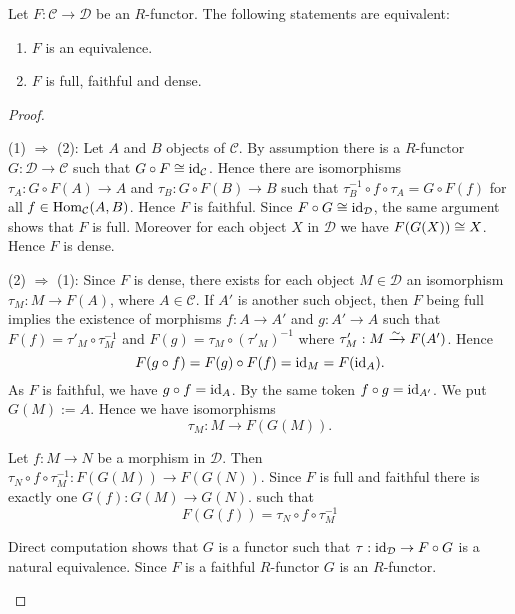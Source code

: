\begin{theorem}\label{3.1.1}
  Let $F: \mathcal{C} \to \mathcal{D}$ be an $R$-functor. The following statements are equivalent:
  \begin{enumerate}
  \item $F$ is an equivalence.
  \item $F$ is full, faithful and dense.
  \end{enumerate}
\end{theorem}
\begin{proof}\
\begin{addmargin}[1cm]{0cm}
\hspace{-1cm}(1) $\Rightarrow$ (2): Let $A$ and $B$ objects of $\mathcal{C}$. By assumption there is a
  $R$-functor $G: \mathcal{D} \to \mathcal{C}$ such that $G \circ F \cong \operatorname{id}_\mathcal{C}$. Hence there are isomorphisms
  $\tau_A: G \circ F(A) \to A$ and $\tau_B: G \circ F(B) \to B$ such that $\tau_B^{-1} \circ f \circ \tau_A = G
  \circ F(f)$ for all $f \in \operatorname{Hom}_\mathcal{C}(A,B)$. Hence $F$ is faithful. Since $F \circ G \cong
  \operatorname{id}_\mathcal{D}$, the same argument shows that $F$ is full.
  Moreover for each object $X$ in $\mathcal{D}$ we have $F(G(X)) \cong X$. Hence $F$ is dense.

\hspace{-1cm}(2) $\Rightarrow$ (1): Since $F$ is dense, there exists for each object $M \in \mathcal{D}$
  an isomorphism $\tau_M: M \to F(A)$, where $A \in \mathcal{C}$. If $A'$ is another such object,
  then $F$ being full implies the existence of morphisms $f: A \to A'$ and $g: A'
  \to A$ such that $F(f) = \tau'_M \circ \tau_M^{-1}$ and $F(g) = \tau_M \circ (\tau'_M)^{-1}$ where
  $\tau'_M : M \xrightarrow{\sim} F(A')$. Hence
    \[ F(g \circ f) = F(g) \circ F(f) = \operatorname{id}_M = F(\operatorname{id}_A). \]
  As $F$ is faithful, we have $g \circ f = \operatorname{id}_A$. By the same token $f \circ g =
  \operatorname{id}_{A'}$. We put $G(M) := A$. Hence we have isomorphisms
   \[ \tau_M: M \to F(G(M)). \]

  Let $f: M \to N$ be a morphism in $\mathcal{D}$. Then $\tau_N \circ f \circ \tau_M^{-1}: F(G(M))
  \to F(G(N))$. Since $F$ is full and faithful there is exactly one $G(f): G(M) \to
  G(N)$. such that 
  \begin{equation}\tag{$*$}
    F(G(f)) = \tau_N \circ f \circ \tau_M^{-1}
  \end{equation}

  Direct computation shows that $G$ is a functor such that $\tau: \operatorname{id}_\mathcal{D} \to F \circ G$ is
  a natural equivalence. Since $F$ is a faithful $R$-functor $G$ is an $R$-functor.
  

\end{addmargin}
\end{proof}
